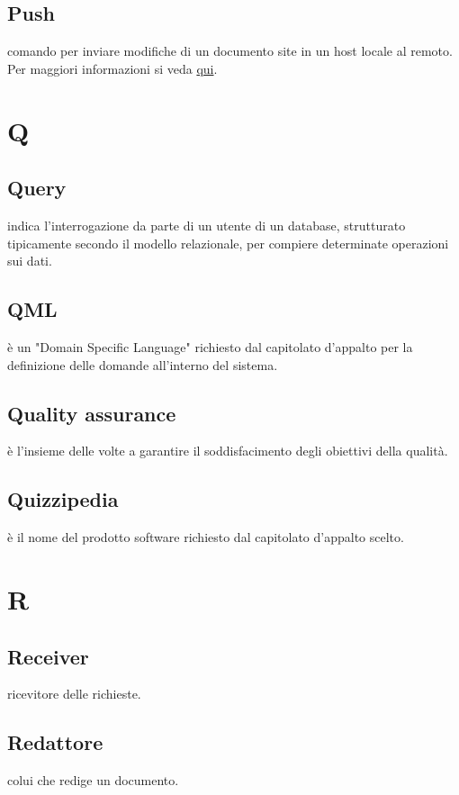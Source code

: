 \documentclass[12pt,a4paper]{article}
\begin{document}
\subsection{Push} 
 comando  per inviare modifiche di un documento site in un host locale al  remoto. Per maggiori informazioni si veda \href{https://git-scm.com/docs/}{qui}.


\newpage

\section{Q}


\subsection{Query} 
indica l'interrogazione da parte di un utente di un database, strutturato tipicamente secondo il modello relazionale, per compiere determinate operazioni sui dati.
\subsection{QML} 
 è un "Domain Specific Language" richiesto dal capitolato d'appalto per la definizione delle domande all'interno del sistema.

\subsection{Quality assurance} 
 è l'insieme delle  volte a garantire il soddisfacimento degli obiettivi della qualità.

\subsection{Quizzipedia} 
 è il nome del prodotto software richiesto dal capitolato d'appalto scelto.


\newpage

\section{R}


	
\subsection{Receiver} 
ricevitore delle richieste.	
	
\subsection{Redattore} 
colui che redige un documento.
\end{document}
